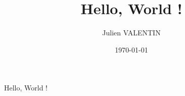 \documentclass[a4paper]{article}
\author{Julien VALENTIN}
\date{\today}
\title{Hello, World !}
\begin{document}
\maketitle
Hello, World !
\end{document}
